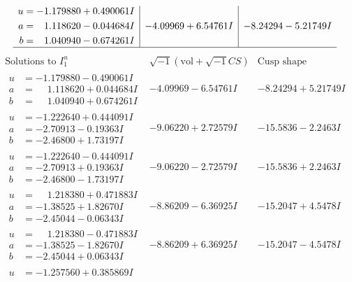 \documentclass[1p]{elsarticle_modified}
\theoremstyle{definition}
\newcommand{\I}{\sqrt{-1}}
\begin{document}
$$\begin{array}{c|c|c}
\begin{aligned}
u &= -1.179880 + 0.490061 I \\
a &= \phantom{-}1.118620 - 0.044684 I \\
b &= \phantom{-}1.040940 - 0.674261 I\end{aligned}
 & -4.09969 + 6.54761 I & -8.24294 - 5.21749 I\\
 \hline 
 \end{array}$$\newpage$$\begin{array}{c|c|c}  
\text{Solutions to }I^u_{1}& \I (\text{vol} + \sqrt{-1}CS) & \text{Cusp shape}\\
 \hline 
\begin{aligned}
u &= -1.179880 - 0.490061 I \\
a &= \phantom{-}1.118620 + 0.044684 I \\
b &= \phantom{-}1.040940 + 0.674261 I\end{aligned}
 & -4.09969 - 6.54761 I & -8.24294 + 5.21749 I \\ \hline\begin{aligned}
u &= -1.222640 + 0.444091 I \\
a &= -2.70913 - 0.19363 I \\
b &= -2.46800 + 1.73197 I\end{aligned}
 & -9.06220 + 2.72579 I & -15.5836 - 2.2463 I \\ \hline\begin{aligned}
u &= -1.222640 - 0.444091 I \\
a &= -2.70913 + 0.19363 I \\
b &= -2.46800 - 1.73197 I\end{aligned}
 & -9.06220 - 2.72579 I & -15.5836 + 2.2463 I \\ \hline\begin{aligned}
u &= \phantom{-}1.218380 + 0.471883 I \\
a &= -1.38525 + 1.82670 I \\
b &= -2.45044 - 0.06343 I\end{aligned}
 & -8.86209 - 6.36925 I & -15.2047 + 4.5478 I \\ \hline\begin{aligned}
u &= \phantom{-}1.218380 - 0.471883 I \\
a &= -1.38525 - 1.82670 I \\
b &= -2.45044 + 0.06343 I\end{aligned}
 & -8.86209 + 6.36925 I & -15.2047 - 4.5478 I \\ \hline\begin{aligned}
u &= -1.257560 + 0.385869 I \\

\end{aligned}
\end{array}$$
\end{document}
